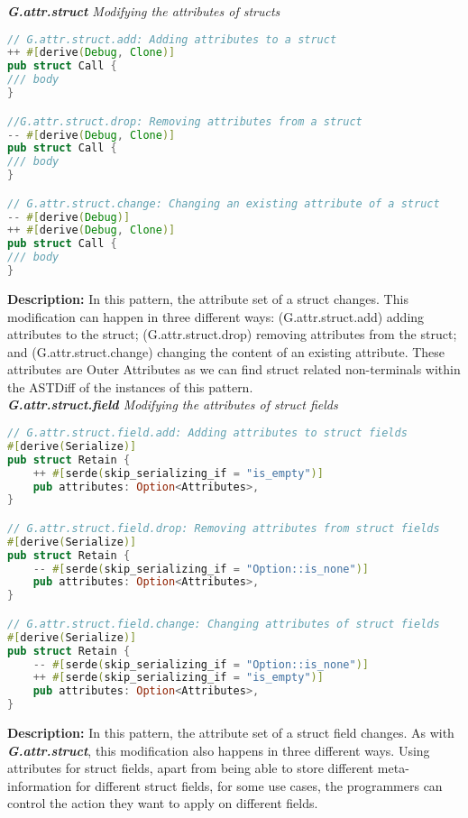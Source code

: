\noindent\textit{\label{sec:G.attr.struct}\textbf{G.attr.struct} Modifying the attributes of structs}

\begin{lstlisting}[language=Rust, style=colouredRust]
// G.attr.struct.add: Adding attributes to a struct
++ #[derive(Debug, Clone)]
pub struct Call {
/// body 
}

//G.attr.struct.drop: Removing attributes from a struct
-- #[derive(Debug, Clone)]
pub struct Call {
/// body 
}

// G.attr.struct.change: Changing an existing attribute of a struct
-- #[derive(Debug)]
++ #[derive(Debug, Clone)]
pub struct Call {
/// body 
}
\end{lstlisting}

\noindent\textbf{Description:} In this pattern, the attribute set of a struct changes. This modification can happen in three different ways: (G.attr.struct.add) adding attributes to the struct; (G.attr.struct.drop) removing attributes from the struct; and (G.attr.struct.change) changing the content of an existing attribute. These attributes are Outer Attributes as we can find struct related non-terminals within the ASTDiff of the instances of this pattern. \\

\noindent\textit{\textbf{G.attr.struct.field} Modifying the attributes of struct fields}

\begin{lstlisting}[language=Rust, style=colouredRust]
// G.attr.struct.field.add: Adding attributes to struct fields
#[derive(Serialize)]
pub struct Retain {
    ++ #[serde(skip_serializing_if = "is_empty")]
    pub attributes: Option<Attributes>,
}

// G.attr.struct.field.drop: Removing attributes from struct fields
#[derive(Serialize)]
pub struct Retain {
    -- #[serde(skip_serializing_if = "Option::is_none")]
    pub attributes: Option<Attributes>,
}

// G.attr.struct.field.change: Changing attributes of struct fields
#[derive(Serialize)]
pub struct Retain {
    -- #[serde(skip_serializing_if = "Option::is_none")]
    ++ #[serde(skip_serializing_if = "is_empty")]
    pub attributes: Option<Attributes>,
}
\end{lstlisting}

\noindent\textbf{Description:} In this pattern, the attribute set of a struct field changes. As with \textit{\textbf{G.attr.struct}}, this modification also happens in three different ways. Using attributes for struct fields, apart from being able to store different meta-information for different struct fields, for some use cases, the programmers can control the action they want to apply on different fields.

